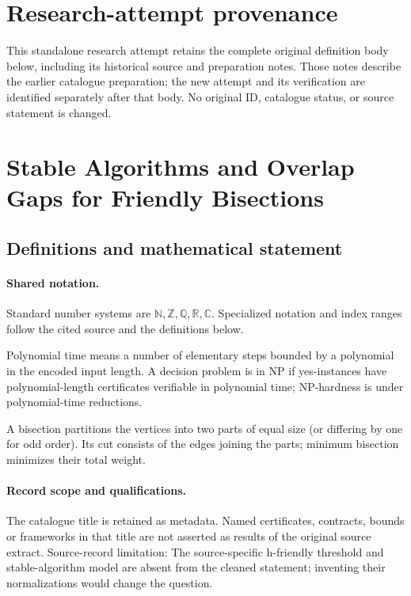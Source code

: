 \documentclass[11pt]{article}
\begin{document}
\section*{Research-attempt provenance}
This standalone research attempt retains the complete original definition body below,
including its historical source and preparation notes. Those notes describe the
earlier catalogue preparation; the new attempt and its verification are identified
separately after that body. No original ID, catalogue status, or source statement is changed.

\section{Stable Algorithms and Overlap Gaps for Friendly Bisections}\label{statement}

\subsection{Definitions and mathematical statement}

\paragraph{Shared notation.}Standard number systems are $\mathbb N,\mathbb Z,\mathbb Q,\mathbb R,\mathbb C$. Specialized notation and index ranges follow the cited source and the definitions below.


Polynomial time means a number of elementary steps bounded by a polynomial in the encoded input length. A decision problem is in $\mathrm{NP}$ if yes-instances have polynomial-length certificates verifiable in polynomial time; NP-hardness is under polynomial-time reductions.

A bisection partitions the vertices into two parts of equal size (or differing by one for odd order). Its cut consists of the edges joining the parts; minimum bisection minimizes their total weight.
\paragraph{Record scope and qualifications.}
The catalogue title is retained as metadata. Named certificates, contracts, bounds or frameworks in that title are not asserted as results of the original source extract.
Source-record limitation: The source-specific h-friendly threshold and stable-algorithm model are absent from the cleaned statement; inventing their normalizations would change the question.
\end{document}
